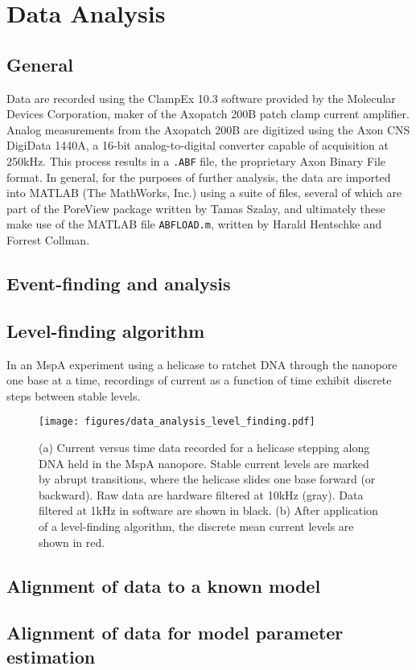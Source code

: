 \chapter{Data Analysis}
\label{data_analysis}

\section{General}

Data are recorded using the ClampEx 10.3 software provided by the Molecular Devices Corporation, maker of the Axopatch 200B patch clamp current amplifier.  Analog measurements from the Axopatch 200B are digitized using the Axon CNS DigiData 1440A, a 16-bit analog-to-digital converter capable of acquisition at 250kHz.  This process results in a \texttt{.ABF} file, the proprietary Axon Binary File format.  In general, for the purposes of further analysis, the data are imported into MATLAB (The MathWorks, Inc.) using a suite of files, several of which are part of the PoreView package written by Tamas Szalay, and ultimately these make use of the MATLAB file \texttt{ABFLOAD.m}, written by Harald Hentschke and Forrest Collman.

\section{Event-finding and analysis}

\section{Level-finding algorithm}

In an MspA experiment using a helicase to ratchet DNA through the nanopore one base at a time, recordings of current as a function of time exhibit discrete steps between stable levels.

\begin{figure}[h]
\begin{centering}
\texttt{[image: figures/data\_analysis\_level\_finding.pdf]}
\caption[Data analysis: level-finding]{(a) Current versus time data recorded for a helicase stepping along DNA held in the MspA nanopore.  Stable current levels are marked by abrupt transitions, where the helicase slides one base forward (or backward).  Raw data are hardware filtered at 10kHz (gray).  Data filtered at 1kHz in software are shown in black.  (b) After application of a level-finding algorithm, the discrete mean current levels are shown in red.}
\label{fig:data_analysis_levels}
\end{centering}
\end{figure}

\section{Alignment of data to a known model}

\section{Alignment of data for model parameter estimation}